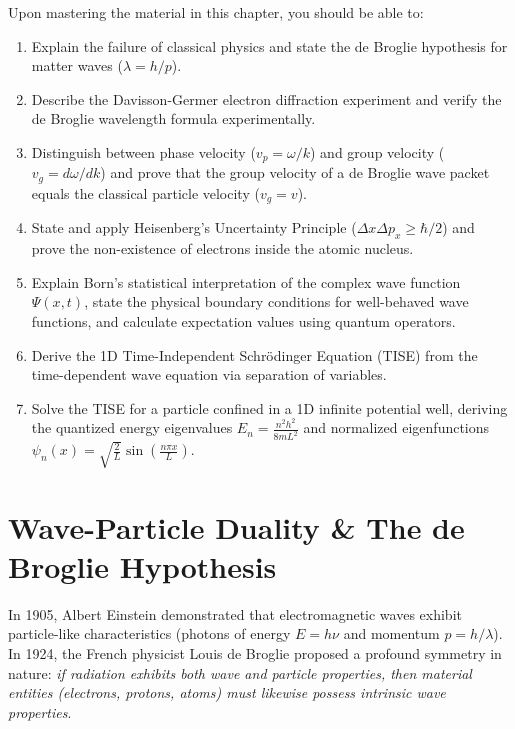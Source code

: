 \begin{important}
Upon mastering the material in this chapter, you should be able to:
\begin{enumerate}
    \item Explain the failure of classical physics and state the de Broglie hypothesis for matter waves ($\lambda = h/p$).
    \item Describe the Davisson-Germer electron diffraction experiment and verify the de Broglie wavelength formula experimentally.
    \item Distinguish between phase velocity ($v_p = \omega/k$) and group velocity ($v_g = d\omega/dk$) and prove that the group velocity of a de Broglie wave packet equals the classical particle velocity ($v_g = v$).
    \item State and apply Heisenberg's Uncertainty Principle ($\Delta x \Delta p_x \ge \hbar/2$) and prove the non-existence of electrons inside the atomic nucleus.
    \item Explain Born's statistical interpretation of the complex wave function $\Psi(x,t)$, state the physical boundary conditions for well-behaved wave functions, and calculate expectation values using quantum operators.
    \item Derive the 1D Time-Independent Schrödinger Equation (TISE) from the time-dependent wave equation via separation of variables.
    \item Solve the TISE for a particle confined in a 1D infinite potential well, deriving the quantized energy eigenvalues $E_n = \frac{n^2 h^2}{8mL^2}$ and normalized eigenfunctions $\psi_n(x) = \sqrt{\frac{2}{L}}\sin\left(\frac{n\pi x}{L}\right)$.
\end{enumerate}
\end{important}

\section{Wave-Particle Duality \& The de Broglie Hypothesis}

In 1905, Albert Einstein demonstrated that electromagnetic waves exhibit particle-like characteristics (photons of energy $E = h\nu$ and momentum $p = h/\lambda$). In 1924, the French physicist Louis de Broglie proposed a profound symmetry in nature: \textit{if radiation exhibits both wave and particle properties, then material entities (electrons, protons, atoms) must likewise possess intrinsic wave properties}.

